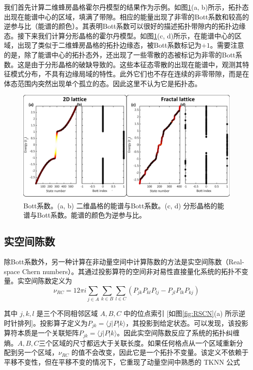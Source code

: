 我们首先计算二维蜂房晶格霍尔丹模型的结果作为示例。如图\ref{fig:SpecAndBott}(a, b)所示，拓扑态出现在能谱中心的区域，填满了带隙。相应的能量出现了非零的Bott系数和较高的逆参与比（能谱的颜色）。其表明Bott系数可以很好的描述拓扑带隙内的拓扑边缘态。接下来我们计算分形晶格的霍尔丹模型。如图\ref{fig:SpecAndBott}(c, d)所示，在能谱中心的区域，出现了类似于二维蜂房晶格的拓扑边缘态，被Bott系数标记为$+1$。需要注意的是，除了能谱中心的拓扑态外，还出现了一些零散的态被标记为非零的Bott系数。这是由于分形晶格的破缺导致的。这些本征态零散的出现在能谱中，观测其特征模式分布，不具有边缘局域的特性。此外它们也不存在连续的非零带隙，而是在体态范围内突然出现单个孤立的态。因此这里不认为它是拓扑态。
\begin{figure}[htbp]
    \centering
    \includegraphics[width=1\linewidth]{figure/FracHaldTheo/SpecAndBott.jpg}
    \caption{Bott系数。(a, b) 二维晶格的能谱与Bott系数。(c, d) 分形晶格的能谱与Bott系数。能谱的颜色为逆参与比。}
    \label{fig:SpecAndBott}
\end{figure}
\subsection{实空间陈数}
除Bott系数外，另一种计算在非动量空间中计算陈数的方法是实空间陈数（Real-space Chern numbers）\cite{kitaev2006anyons,mitchell2018amorphous}。其通过投影算符的空间非对易性直接量化系统的拓扑不变量。实空间陈数定义为
\begin{equation}
\nu_{RC} = 12\pi i \sum_{j\in A} \sum_{k\in B} \sum_{l\in C} (P_{jk} P_{kl} P_{lj} - P_{jl} P_{lk} P_{kj})
\end{equation}

其中 \( j, k, l \) 是三个不同相邻区域 \( A, B, C \) 中的位点索引 [如图\ref{fig:RSCN}(a) 所示逆时针排列]。投影算子定义为\( P_{jk} = \langle j|P|k \rangle \)，其投影到给定状态。可以发现，该投影算符本质是一个关联矩阵$P_{jk} = \langle j|P|k \rangle$。因此实空间陈数反应了系统的拓扑纠缠熵\cite{kitaev2006topological,levin2006detecting,li2008entanglement,fan2023generalized}。\( A, B, C \)三个区域的尺寸都远大于关联长度。如果任何格点从一个区域重新分配到另一个区域，$\nu_{RC}$ 的值不会改变，因此它是一个拓扑不变量。该定义不依赖于平移不变性，但在平移不变的情况下，它重现了动量空间中熟悉的 TKNN 公式\cite{thouless1982quantized}

